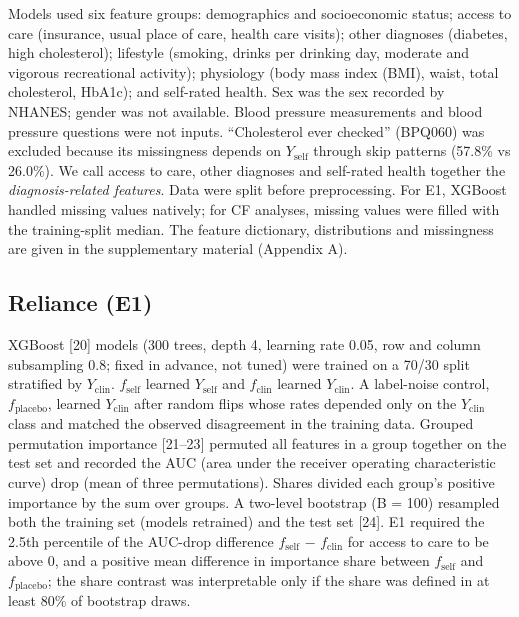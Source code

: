 \documentclass[preprint,review,12pt,times]{elsarticle}
\begin{document}
Models used six feature groups: demographics and socioeconomic status;
access to care (insurance, usual place of care, health care visits);
other diagnoses (diabetes, high cholesterol); lifestyle (smoking, drinks
per drinking day, moderate and vigorous recreational activity);
physiology (body mass index (BMI), waist, total cholesterol, HbA1c); and
self-rated health. Sex was the sex recorded by NHANES; gender was not
available. Blood pressure measurements and blood pressure questions were
not inputs. ``Cholesterol ever checked'' (BPQ060) was excluded because
its missingness depends on \(Y_{\mathrm{self}}\) through skip patterns
(57.8\% vs 26.0\%). We call access to care, other diagnoses and
self-rated health together the \emph{diagnosis-related features}. Data
were split before preprocessing. For E1, XGBoost handled missing values
natively; for CF analyses, missing values were filled with the
training-split median. The feature dictionary, distributions and
missingness are given in the supplementary material (Appendix A).

\subsection{Reliance (E1)}

XGBoost {[}20{]} models (300 trees, depth 4, learning rate 0.05, row and
column subsampling 0.8; fixed in advance, not tuned) were trained on a
70/30 split stratified by \(Y_{\mathrm{clin}}\).
\emph{\(f_{\mathrm{self}}\)} learned \(Y_{\mathrm{self}}\) and
\emph{\(f_{\mathrm{clin}}\)} learned \(Y_{\mathrm{clin}}\). A
label-noise control, \emph{\(f_{\mathrm{placebo}}\)}, learned
\(Y_{\mathrm{clin}}\) after random flips whose rates depended only on
the \(Y_{\mathrm{clin}}\) class and matched the observed disagreement in
the training data. Grouped permutation importance {[}21--23{]} permuted
all features in a group together on the test set and recorded the AUC
(area under the receiver operating characteristic curve) drop (mean of
three permutations). Shares divided each group's positive importance by
the sum over groups. A two-level bootstrap (B = 100) resampled both the
training set (models retrained) and the test set {[}24{]}. E1 required
the 2.5th percentile of the AUC-drop difference \(f_{\mathrm{self}}\) −
\(f_{\mathrm{clin}}\) for access to care to be above 0, and a positive
mean difference in importance share between \(f_{\mathrm{self}}\) and
\(f_{\mathrm{placebo}}\); the share contrast was interpretable only if
the share was defined in at least 80\% of bootstrap draws.
\end{document}
